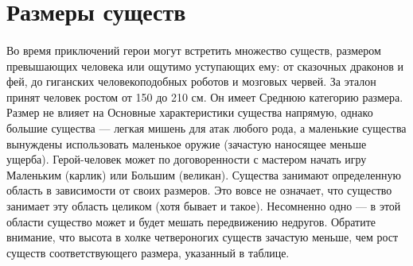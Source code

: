 \section{Размеры существ}
\paragraph{}
Во время приключений герои могут встретить множество существ, размером превышающих человека или ощутимо уступающих ему: от сказочных драконов и фей, до гиганских человекоподобных роботов и мозговых червей. За эталон принят человек ростом от 150 до 210 см. Он имеет Среднюю категорию размера. Размер не влияет на Основные характеристики существа напрямую, однако большие существа — легкая мишень для атак любого рода, а маленькие существа вынуждены использовать маленькое оружие (зачастую наносящее меньше ущерба). Герой-человек может по договоренности с мастером начать игру Маленьким (карлик) или Большим (великан).
\newline
Существа занимают определенную область в зависимости от своих размеров. Это вовсе не означает, что существо занимает эту область целиком (хотя бывает и такое). Несомненно одно — в этой области существо может и будет мешать передвижению недругов. Обратите внимание, что высота в холке четвероногих существ зачастую меньше, чем рост существ соответствующего размера, указанный в таблице.
